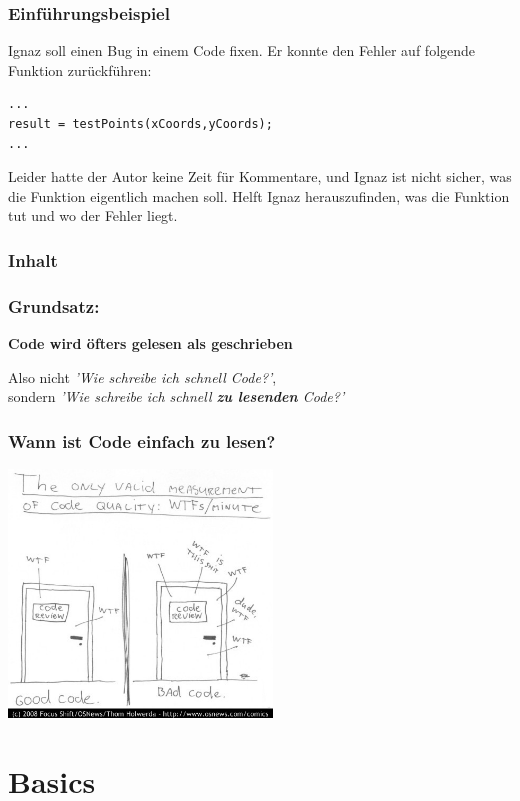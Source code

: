 \documentclass[handout]{beamer}
\begin{document}
\begin{frame}[fragile]
    \frametitle{Einführungsbeispiel}
    Ignaz soll einen Bug in einem Code fixen. Er konnte den Fehler auf folgende
    Funktion zurückführen:
\begin{lstlisting}
...
result = testPoints(xCoords,yCoords);
...
\end{lstlisting}
Leider hatte der Autor keine Zeit für Kommentare, und Ignaz ist nicht sicher,
was die Funktion eigentlich machen soll. Helft Ignaz herauszufinden,
was die Funktion  tut und wo der Fehler liegt.
\end{frame}

\begin{frame}
    \frametitle{Inhalt}
    \tableofcontents
\end{frame}



\begin{frame}
    \frametitle{Grundsatz:}
    \begin{center}
        \huge \bf Code wird öfters gelesen als geschrieben
    \end{center}
    \vspace{2em}\pause
    Also nicht \textit{'Wie schreibe ich schnell Code?'}, \\
    sondern \textit{'Wie schreibe ich schnell \textbf{zu lesenden} Code?'}
\end{frame}

\begin{frame}
    \frametitle{Wann ist Code einfach zu lesen?}
    \begin{center}
        \includegraphics[width=7cm]{wtfm.jpg}
    \end{center}
\end{frame}

\section{Basics}
\begin{frame}
    \tableofcontents[currentsection]
\end{frame}
\end{document}
